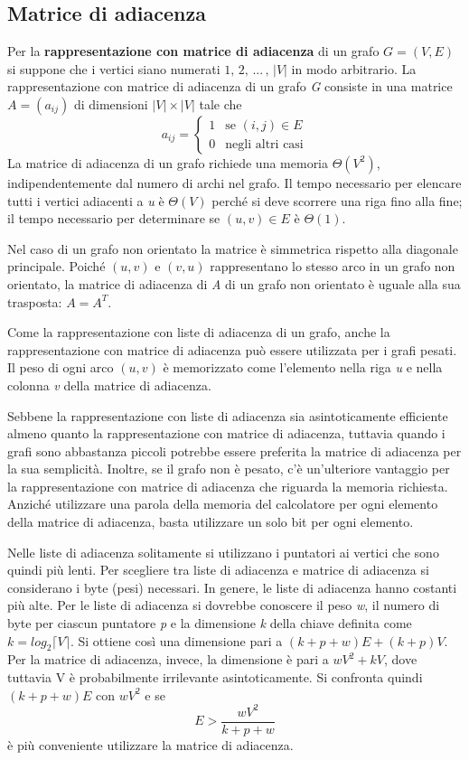 \documentclass[10pt, a4paper]{report}
\begin{document}
\subsection{Matrice di adiacenza}
Per la \textbf{rappresentazione con matrice di adiacenza} di un grafo $G = (V,E)$ si suppone che i vertici siano numerati $1,\,2,\,...\,,\,|V|$ in modo arbitrario. La rappresentazione con matrice di adiacenza di un grafo \textit{G} consiste in una matrice $A = (a_{ij})$ di dimensioni $|V| \times |V|$ tale che
\begin{equation*}
a_{ij} = \left\{
\begin{array}{ll}
1 &\text{se } (i,j) \in E\\
0 &\text{negli altri casi}
\end{array}\right.
\end{equation*}
La matrice di adiacenza di un grafo richiede una memoria $\Theta(V^2)$, indipendentemente dal numero di archi nel grafo. Il tempo necessario per elencare tutti i vertici adiacenti a \textit{u} è $\Theta(V)$ perché si deve scorrere una riga fino alla fine; il tempo necessario per determinare se $(u,v) \in E$ è $\Theta(1)$.

Nel caso di un grafo non orientato la matrice è simmetrica rispetto alla diagonale principale. Poiché $(u,v)$ e $(v,u)$ rappresentano lo stesso arco in un grafo non orientato, la matrice di adiacenza di \textit{A} di un grafo non orientato è uguale alla sua trasposta: $A = A^T$.

Come la rappresentazione con liste di adiacenza di un grafo, anche la rappresentazione con matrice di adiacenza può essere utilizzata per i grafi pesati. Il peso di ogni arco $(u,v)$ è memorizzato come l'elemento nella riga \textit{u} e nella colonna \textit{v} della matrice di adiacenza.

Sebbene la rappresentazione con liste di adiacenza sia asintoticamente efficiente almeno quanto la rappresentazione con matrice di adiacenza, tuttavia quando i grafi sono abbastanza piccoli potrebbe essere preferita la matrice di adiacenza per la sua semplicità. Inoltre, se il grafo non è pesato, c'è un'ulteriore vantaggio per la rappresentazione con matrice di adiacenza che riguarda la memoria richiesta. Anziché utilizzare una parola della memoria del calcolatore per ogni elemento della matrice di adiacenza, basta utilizzare un solo bit per ogni elemento.

Nelle liste di adiacenza solitamente si utilizzano i puntatori ai vertici che sono quindi più lenti. Per scegliere tra liste di adiacenza e matrice di adiacenza si considerano i byte (pesi) necessari. In genere, le liste di adiacenza hanno costanti più alte. Per le liste di adiacenza si dovrebbe conoscere il peso \textit{w}, il numero di byte per ciascun puntatore \textit{p} e la dimensione \textit{k} della chiave definita come $k = log_2\lceil V \rceil$. Si ottiene così una dimensione pari a $(k + p + w)E + (k + p)V$. Per la matrice di adiacenza, invece, la dimensione è pari a $wV^2 + kV$, dove tuttavia V è probabilmente irrilevante asintoticamente. Si confronta quindi $(k + p + w)E $ con $wV^2$ e se
\begin{equation*}
E > \frac{wV^2}{k + p + w}
\end{equation*}
è più conveniente utilizzare la matrice di adiacenza.
\end{document}
